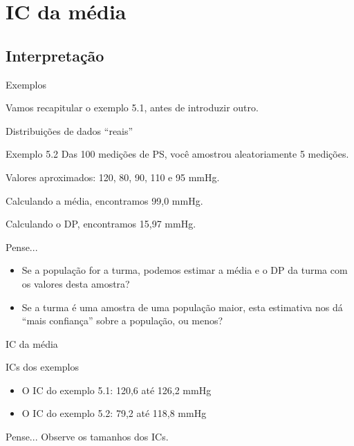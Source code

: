 \documentclass{beamer}
\begin{document}
\section{IC da média}

\subsection{Interpretação}

\begin{frame}{Exemplos}
  \begin{center}
    Vamos recapitular o exemplo 5.1, antes de introduzir outro.
  \end{center}
\end{frame}


\begin{frame}{Distribuições de dados ``reais''}
  \begin{exampleblock}{Exemplo 5.2}
    Das 100 medições de PS, você amostrou aleatoriamente 5 medições.

    Valores aproximados: 120, 80, 90, 110 e 95 mmHg.

    Calculando a média, encontramos 99,0 mmHg.

    Calculando o DP, encontramos 15,97 mmHg.
  \end{exampleblock}
  \begin{block}{Pense...}
    \begin{itemize}
    \item Se a população for a turma, podemos estimar a média e o DP da turma com os valores desta amostra?
    \item Se a turma é uma amostra de uma população maior, esta estimativa nos dá ``mais confiança'' sobre a população, ou menos?
    \end{itemize}
  \end{block}
\end{frame}

\begin{frame}{IC da média}
  \begin{exampleblock}{ICs dos exemplos}
    \begin{itemize}
    \item O IC do exemplo 5.1: 120,6 até 126,2 mmHg
    \item O IC do exemplo 5.2: 79,2 até 118,8 mmHg
    \end{itemize}
  \end{exampleblock}
  \begin{block}{Pense...}
    Observe os tamanhos dos ICs.
  \end{block}
\end{frame}
\end{document}
